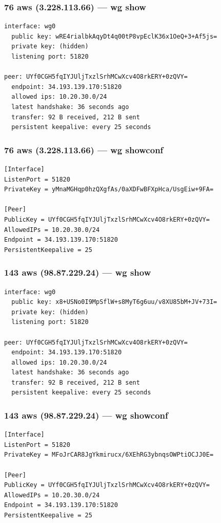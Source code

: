 \documentclass[11pt,a4paper]{article}
\begin{document}
\subsubsection*{76 aws (3.228.113.66) — wg show}
\begin{lstlisting}
interface: wg0
  public key: wRE4rialbkAqyDt4q00tP8vpEclK36x1OeQ+3+Af5js=
  private key: (hidden)
  listening port: 51820

peer: UYf0CGH5fqIYJUljTxzlSrhMCwXcv4O8rkERY+0zQVY=
  endpoint: 34.193.139.170:51820
  allowed ips: 10.20.30.0/24
  latest handshake: 36 seconds ago
  transfer: 92 B received, 212 B sent
  persistent keepalive: every 25 seconds

\end{lstlisting}

\subsubsection*{76 aws (3.228.113.66) — wg showconf}
\begin{lstlisting}
[Interface]
ListenPort = 51820
PrivateKey = yMnaMGHqp0hzQXgfAs/0aXDFwBFXpHca/UsgEiw+9FA=

[Peer]
PublicKey = UYf0CGH5fqIYJUljTxzlSrhMCwXcv4O8rkERY+0zQVY=
AllowedIPs = 10.20.30.0/24
Endpoint = 34.193.139.170:51820
PersistentKeepalive = 25

\end{lstlisting}

\subsubsection*{143 aws (98.87.229.24) — wg show}
\begin{lstlisting}
interface: wg0
  public key: x8+USNo0I9MpSflW+s8MyT6g6uu/v8XU85bM+JV+73I=
  private key: (hidden)
  listening port: 51820

peer: UYf0CGH5fqIYJUljTxzlSrhMCwXcv4O8rkERY+0zQVY=
  endpoint: 34.193.139.170:51820
  allowed ips: 10.20.30.0/24
  latest handshake: 36 seconds ago
  transfer: 92 B received, 212 B sent
  persistent keepalive: every 25 seconds

\end{lstlisting}

\subsubsection*{143 aws (98.87.229.24) — wg showconf}
\begin{lstlisting}
[Interface]
ListenPort = 51820
PrivateKey = MFoJrCAR8JgYkmirucx/6XEhRG3ybnqsOWPtiOCJJ0E=

[Peer]
PublicKey = UYf0CGH5fqIYJUljTxzlSrhMCwXcv4O8rkERY+0zQVY=
AllowedIPs = 10.20.30.0/24
Endpoint = 34.193.139.170:51820
PersistentKeepalive = 25

\end{lstlisting}
\end{document}
